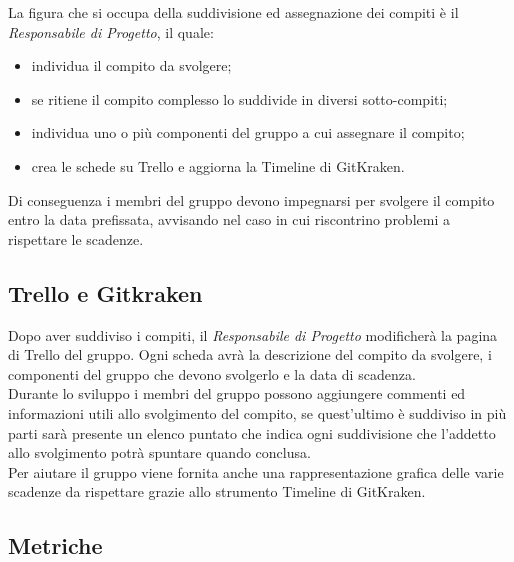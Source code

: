 La figura che si occupa della suddivisione ed assegnazione dei compiti è il \textit{Responsabile di Progetto}, il quale:
\begin{itemize}
	\item individua il compito da svolgere;
	\item se ritiene il compito complesso lo suddivide in diversi sotto-compiti;
	\item individua uno o più componenti del gruppo a cui assegnare il compito;
	\item crea le schede su Trello e aggiorna la Timeline di GitKraken.
\end{itemize}

Di conseguenza i membri del gruppo devono impegnarsi per svolgere il compito entro la data prefissata, avvisando nel caso in cui riscontrino problemi a rispettare le scadenze.

\subsection{Trello e Gitkraken}\label{4.2.4}

Dopo aver suddiviso i compiti, il \textit{Responsabile di Progetto} modificherà la pagina di Trello del gruppo. Ogni scheda avrà la descrizione del compito da svolgere, i componenti del gruppo che devono svolgerlo e la data di scadenza. \\
Durante lo sviluppo i membri del gruppo possono aggiungere commenti ed informazioni utili allo svolgimento del compito, se quest'ultimo è suddiviso in più parti sarà presente un elenco puntato che indica ogni suddivisione che l'addetto allo svolgimento potrà spuntare quando conclusa. \\
Per aiutare il gruppo viene fornita anche una rappresentazione grafica delle varie scadenze da rispettare grazie allo strumento Timeline di GitKraken.

\subsection{Metriche}\label{4.2.5}

